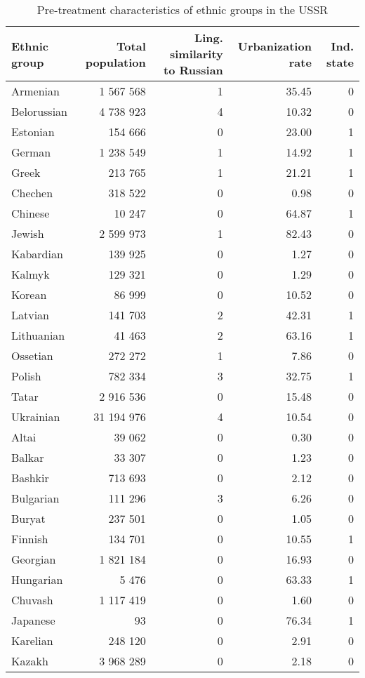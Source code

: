 \begin{table}[!h]
\caption{\label{tab:sc_predictors}Pre-treatment characteristics of ethnic groups in the USSR}
\centering
\begin{threeparttable}
\begin{tabular}{lrrrr}
\toprule
Ethnic group & Total population & Ling. similarity to Russian & Urbanization rate & Ind. state\\
\midrule
Armenian & 1 567 568 & 1 & 35.45 & 0\\
Belorussian & 4 738 923 & 4 & 10.32 & 0\\
Estonian & 154 666 & 0 & 23.00 & 1\\
German & 1 238 549 & 1 & 14.92 & 1\\
Greek & 213 765 & 1 & 21.21 & 1\\
Chechen & 318 522 & 0 & 0.98 & 0\\
Chinese & 10 247 & 0 & 64.87 & 1\\
Jewish & 2 599 973 & 1 & 82.43 & 0\\
Kabardian & 139 925 & 0 & 1.27 & 0\\
Kalmyk & 129 321 & 0 & 1.29 & 0\\
Korean & 86 999 & 0 & 10.52 & 0\\
Latvian & 141 703 & 2 & 42.31 & 1\\
Lithuanian & 41 463 & 2 & 63.16 & 1\\
Ossetian & 272 272 & 1 & 7.86 & 0\\
Polish & 782 334 & 3 & 32.75 & 1\\
Tatar & 2 916 536 & 0 & 15.48 & 0\\
Ukrainian & 31 194 976 & 4 & 10.54 & 0\\
Altai & 39 062 & 0 & 0.30 & 0\\
Balkar & 33 307 & 0 & 1.23 & 0\\
Bashkir & 713 693 & 0 & 2.12 & 0\\
Bulgarian & 111 296 & 3 & 6.26 & 0\\
Buryat & 237 501 & 0 & 1.05 & 0\\
Finnish & 134 701 & 0 & 10.55 & 1\\
Georgian & 1 821 184 & 0 & 16.93 & 0\\
Hungarian & 5 476 & 0 & 63.33 & 1\\
Chuvash & 1 117 419 & 0 & 1.60 & 0\\
Japanese & 93 & 0 & 76.34 & 1\\
Karelian & 248 120 & 0 & 2.91 & 0\\
Kazakh & 3 968 289 & 0 & 2.18 & 0\\

\end{tabular}
\end{threeparttable}
\end{table}
